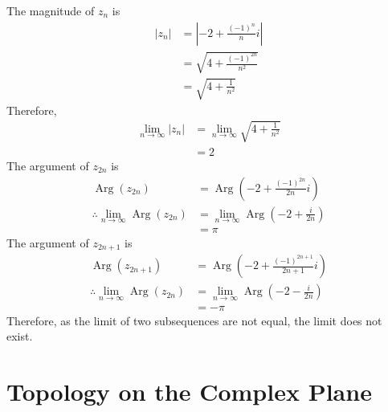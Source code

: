 \documentclass[titlepage, fleqn, a4paper, 12pt, twoside]{article}
\theoremstyle{definition}
\theoremstyle{theorem}
\DeclareMathOperator{\Arg}{Arg}
\begin{document}
\begin{solution}
	The magnitude of $z_n$ is
	\begin{align*}
		|z_n| & = \left| -2 + \frac{(-1)^n}{n} i \right| \\
                      & = \sqrt{4 + \frac{(-1)^{2 n}}{n^2}}      \\
                      & = \sqrt{4 + \frac{1}{n^2}}
	\end{align*}
	Therefore,
	\begin{align*}
		\lim\limits_{n \to \infty} |z_n| & = \lim\limits_{n \to \infty} \sqrt{4 + \frac{1}{n^2}} \\
                                                 & = 2
	\end{align*}
	The argument of $z_{2 n}$ is
	\begin{align*}
		\Arg(z_{2 n})                                       & = \Arg\left( -2 + \frac{(-1)^{2 n}}{2 n} i \right)                 \\
		\therefore \lim\limits_{n \to \infty} \Arg(z_{2 n}) & = \lim\limits_{n \to \infty} \Arg\left( -2 + \frac{i}{2 n} \right) \\
                                                                    & = \pi
	\end{align*}
	The argument of $z_{2 n + 1}$ is
	\begin{align*}
		\Arg(z_{2 n + 1})                                   & = \Arg\left( -2 + \frac{(-1)^{2 n + 1}}{2 n + 1} i \right)         \\
		\therefore \lim\limits_{n \to \infty} \Arg(z_{2 n}) & = \lim\limits_{n \to \infty} \Arg\left( -2 - \frac{i}{2 n} \right) \\
                                                                    & = -\pi
	\end{align*}
	Therefore, as the limit of two subsequences are not equal, the limit does not exist.
\end{solution}

\newpage
\part{Topology on the Complex Plane}
\end{document}
